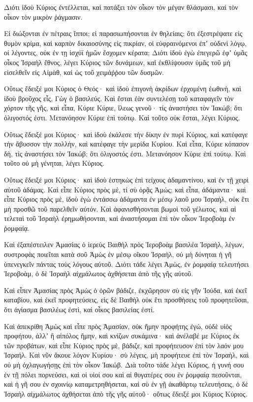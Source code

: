 \begin{spacing}{1.1}
\begin{multicols}{2}
Διότι ἰδοὺ Κύριος ἐντέλλεται, καὶ πατάξει τὸν οἶκον τὸν μέγαν θλάσμασι, καὶ τὸν οἶκον τὸν μικρὸν ῥάγμασιν.

Εἰ διώξονται ἐν πέτραις ἵπποι; εἰ παρασιωπήσονται ἐν θηλείαις; ὅτι ἐξεστρέψατε εἰς θυμὸν κρίμα, καὶ καρπὸν δικαιοσύνης εἰς πικρίαν,
οἱ εὐφραινόμενοι ἐπʼ οὐδενὶ λόγῳ, οἱ λέγοντες, οὐκ ἐν τῃ ἰσχύϊ ἡμῶν ἔσχομεν κέρατα;
Διότι ἰδοὺ ἐγὼ ἐπεγερῶ ἐφʼ ὑμᾶς οἶκος Ἰσραὴλ ἔθνος, λέγει Κύριος τῶν δυνάμεων, καὶ ἐκθλίψουσιν ὑμᾶς τοῦ μὴ εἰσελθεῖν εἰς Αἰμὰθ, καὶ ὡς τοῦ χειμάῤῥου τῶν δυσμῶν.

Οὕτως ἔδειξέ μοι Κύριος ὁ Θεός· καὶ ἰδοὺ ἐπιγονὴ ἀκρίδων ἐρχομένη ἑωθινὴ, καὶ ἰδοὺ βροῦχος εἷς, Γὼγ ὁ βασιλεύς.
Καὶ ἔσται ἐὰν συντελέσῃ τοῦ καταφαγεῖν τὸν χόρτον τῆς γῆς, καὶ εἶπα, Κύριε Κύριε, ἵλεως γενοῦ· τίς ἀναστήσει τὸν Ἰακώβ; ὅτι ὀλιγοστός ἐστι.
Μετανόησον Κύριε ἐπὶ τούτῳ. Καὶ τοῦτο οὐκ ἔσται, λέγει Κύριος.

Οὕτως ἔδειξέ μοι Κύριος· καὶ ἰδοὺ ἐκάλεσε τὴν δίκην ἐν πυρὶ Κύριος, καὶ κατέφαγε τὴν ἄβυσσον τὴν πολλὴν, καὶ κατέφαγε τὴν μερίδα Κυρίου.
Καὶ εἶπα, Κύριε κόπασον δὴ, τίς ἀναστήσει τὸν Ἰακώβ; ὅτι ὀλιγοστός ἐστι.
Μετανόησον Κύριε ἐπὶ τούτῳ. Καὶ τοῦτο οὐ μὴ γένηται, λέγει Κύριος.

Οὕτως ἔδειξέ μοι Κύριος· καὶ ἰδοὺ ἑστηκὼς ἐπὶ τείχους ἀδαμαντίνου, καὶ ἐν τῇ χειρὶ αὐτοῦ ἀδάμας.
Καὶ εἶπε Κύριος πρὸς μὲ, τί σὺ ὁρᾷς Ἀμώς; καὶ εἶπα, ἀδάμαντα· καὶ εἶπε Κύριος πρὸς μὲ, ἰδοὺ ἐγὼ ἐντάσσω ἀδάμαντα ἐν μέσῳ λαοῦ μου Ἰσραὴλ, οὐκ ἔτι μὴ προσθῶ τοῦ παρελθεῖν αὐτόν.
Καὶ ἀφανισθήσονται βωμοὶ τοῦ γέλωτος, καὶ αἱ τελεταὶ τοῦ Ἰσραὴλ ἐρημωθήσονται, καὶ ἀναστήσομαι ἐπὶ τὸν οἶκον Ἱεροβοὰμ ἐν ῥομφαίᾳ.

Καὶ ἐξαπέστειλεν Ἀμασίας ὁ ἱερεὺς Βαιθὴλ πρὸς Ἱεροβοὰμ βασιλέα Ἰσραὴλ, λέγων, συστροφὰς ποιεῖται κατὰ σοῦ Ἀμὼς ἐν μέσῳ οἴκου Ἰσραὴλ, οὐ μὴ δύνηται ἡ γῆ ὑπενεγκεῖν πάντας τοὺς λόγους αὐτοῦ.
Διότι τάδε λέγει Ἀμὼς, ἐν ῥομφαίᾳ τελευτήσει Ἱεροβοὰμ, ὁ δὲ Ἰσραὴλ αἰχμάλωτος ἀχθήσεται ἀπὸ τῆς γῆς αὐτοῦ.

Καὶ εἶπεν Ἀμασίας πρὸς Ἀμὼς ὁ ὁρῶν βάδιζε, ἐκχῶρησον σὺ εἰς γῆν Ἰούδα, καὶ ἐκεῖ καταβίου, καὶ ἐκεῖ προφητεύσεις,
εἰς δὲ Βαιθὴλ οὐκ ἔτι προσθήσεις τοῦ προφητεῦσαι, ὅτι ἁγίασμα βασιλέως ἐστὶ, καὶ οἶκος βασιλείας ἐστί.

Καὶ ἀπεκρίθη Ἀμὼς καὶ εἶπε πρὸς Ἀμασίαν, οὐκ ἤμην προφήτης ἐγὼ, οὐδὲ υἱὸς προφήτου, ἀλλʼ ἢ αἰπόλος ἤμην, καὶ κνίζων συκάμινα·
καὶ ἀνέλαβέ με Κύριος ἐκ τῶν προβάτων, καὶ εἶπε Κύριος πρὸς μὲ, βάδιζε, καὶ προφήτευσον ἐπὶ τὸν λαόν μου Ἰσραήλ.
Καὶ νῦν ἄκουε λόγον Κυρίου· σὺ λέγεις, μὴ προφήτευε ἐπὶ τὸν Ἰσραὴλ, καὶ οὐ μὴ ὀχλαγωγήσῃς ἐπὶ τὸν οἶκον Ἰακώβ.
Διὰ τοῦτο τάδε λέγει Κύριος, ἡ γυνή σου ἐν τῇ πόλει πορνεύσει, καὶ οἱ υἱοί σου καὶ αἱ θυγατέρες σου ἐν ῥομφαίᾳ πεσοῦνται, καὶ ἡ γῆ σου ἐν σχοινίῳ καταμετρηθήσεται, καὶ σὺ ἐν γῇ ἀκαθάρτῳ τελευτήσεις, ὁ δὲ Ἰσραὴλ αἰχμάλωτος ἀχθήσεται ἀπὸ τῆς γῆς αὐτοῦ· οὕτως ἔδειξέ μοι Κύριος Κύριος.


\end{multicols}
\end{spacing}
